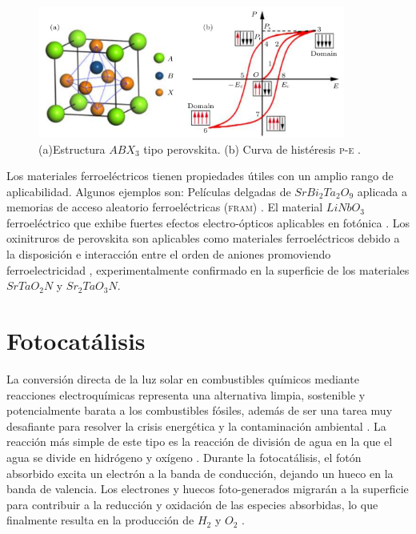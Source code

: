 \begin{figure}[H]
    \centering
    \includegraphics[width=0.9\textwidth]{Figs/polarization.png}
    \caption{(a)Estructura $ABX_{3}$ tipo perovskita. (b) Curva de histéresis \textsc{p-e} \cite{Cui2020ResearchSemiconductors}.}
    \label{Fig. p-e}
\end{figure}

Los materiales ferroeléctricos tienen propiedades útiles con un amplio rango de aplicabilidad. Algunos ejemplos son: Películas delgadas de $SrBi_{2}Ta_{2}O_{9}$ aplicada a memorias de acceso aleatorio ferroeléctricas (\textsc{fram}) \cite{Sreenivas1994film}. El material $LiNbO_{3}$ ferroeléctrico que exhibe fuertes efectos electro-ópticos aplicables en fotónica \cite{Whatmore2021celebrration}. Los oxinitruros de perovskita son aplicables como materiales ferroeléctricos \cite{Bouri2018} debido a la disposición e interacción entre el orden de aniones promoviendo ferroelectricidad \cite{Gou2020Photocatalysis,Yang_2015}, experimentalmente confirmado en la superficie de los materiales $SrTaO_{2}N$ y $Sr_{2}TaO_{3}N$\cite{Suemoto2018IntergrowthSr2TaO3N}. 

\section{Fotocatálisis}

La conversión directa de la luz solar en combustibles químicos mediante reacciones electroquímicas representa una alternativa limpia, sostenible y potencialmente barata a los combustibles fósiles, además de ser una tarea muy desafiante para resolver la crisis energética y la contaminación ambiental \cite{Cen2019OptimizedSplitting}. La reacción más simple de este tipo es la reacción de división de agua en la que el agua se divide en hidrógeno y oxígeno \cite{Castelli_2013}. Durante la fotocatálisis, el fotón absorbido excita un electrón a la banda de conducción, dejando un hueco en la banda de valencia. Los electrones y huecos foto-generados migrarán a la superficie para contribuir a la reducción y oxidación de las especies absorbidas, lo que finalmente resulta en la producción de $H_{2}$ y $O_{2}$ \cite{Bouri2018}.


